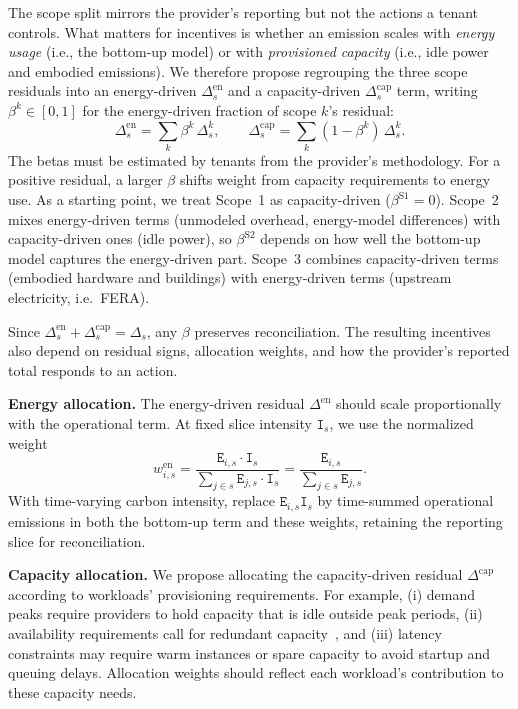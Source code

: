 \documentclass[sigconf]{acmart}
\newcommand{\parag}[1]{\vspace{2mm}\noindent\textbf{#1.}\hspace{2mm}}
\newcommand{\E}{\texttt{E}\xspace}
\newcommand{\I}{\texttt{I}\xspace}
\begin{document}
The scope split mirrors the provider's reporting but not the actions a tenant controls.
What matters for incentives is whether an emission scales with \emph{energy usage} (i.e., the bottom-up model) or with \emph{provisioned capacity} (i.e., idle power and embodied emissions).
We therefore propose regrouping the three scope residuals into an energy-driven $\Delta^{\text{en}}_{s}$ and a capacity-driven $\Delta^{\text{cap}}_{s}$ term, writing $\beta^{k}\in[0,1]$ for the energy-driven fraction of scope $k$'s residual:
\begin{equation}
\Delta^{\text{en}}_{s} = \sum_{k} \beta^{k}\,\Delta^{k}_{s}, \qquad
\Delta^{\text{cap}}_{s} = \sum_{k} (1-\beta^{k})\,\Delta^{k}_{s}.
\label{eq:residual-levers}
\end{equation}
The betas must be estimated by tenants from the provider's methodology.
For a positive residual, a larger $\beta$ shifts weight from capacity requirements to energy use.
As a starting point, we treat Scope~1 as capacity-driven ($\beta^{\text{S1}}=0$).
Scope~2 mixes energy-driven terms (unmodeled overhead, energy-model differences) with capacity-driven ones (idle power), so $\beta^{\text{S2}}$ depends on how well the bottom-up model captures the energy-driven part.
Scope~3 combines capacity-driven terms (embodied hardware and buildings) with energy-driven terms (upstream electricity, i.e.\ FERA).

Since $\Delta^{\text{en}}_s + \Delta^{\text{cap}}_s = \Delta_s$, any $\beta$ preserves reconciliation.
The resulting incentives also depend on residual signs, allocation weights, and how the provider's reported total responds to an action.

\parag{Energy allocation}
The energy-driven residual $\Delta^{\text{en}}$ should scale proportionally with the operational term.
At fixed slice intensity $\I_s$, we use the normalized weight
\begin{equation}
w^{\text{en}}_{i,s} = \frac{\E_{i,s}\cdot\I_s}{\sum_{j \in s} \E_{j,s}\cdot\I_s} = \frac{\E_{i,s}}{\sum_{j \in s} \E_{j,s}}.
\label{eq:w-energy}
\end{equation}
With time-varying carbon intensity, replace $\E_{i,s}\I_s$ by time-summed operational emissions in both the bottom-up term and these weights, retaining the reporting slice for reconciliation.

\parag{Capacity allocation}
We propose allocating the capacity-driven residual $\Delta^{\text{cap}}$ according to workloads' provisioning requirements.
For example, (i) demand peaks require providers to hold capacity that is idle outside peak periods, (ii) availability requirements call for redundant capacity~\cite{eilam2021transparent}, and (iii) latency constraints may require warm instances or spare capacity to avoid startup and queuing delays.
Allocation weights should reflect each workload’s contribution to these capacity needs.
\end{document}
